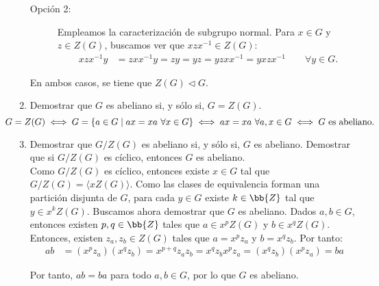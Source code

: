 \begin{ejercicio}
\begin{enumerate}
\begin{description}
            \item[Opción 2:]
            Empleamos la caracterización de subgrupo normal. Para $x\in G$ y $z\in Z(G)$, buscamos ver que $xzx^{-1}\in Z(G)$:
            \begin{align*}
                xzx^{-1}y &= zxx^{-1}y = zy = yz = yzxx^{-1} = yxzx^{-1}\qquad \forall y\in G.
            \end{align*}
        \end{description}
        En ambos casos, se tiene que $Z(G)\lhd G$.
        \item Demostrar que $G$ es abeliano si, y sólo si, $G=Z(G)$.
        \begin{equation*}
            \hspace{-1cm}G=Z(G) \iff G=\{a\in G\mid ax=xa\ \forall x\in G\} \iff ax=xa\ \forall a,x\in G \iff G\text{ es abeliano.}
        \end{equation*}
        \item\label{ej:4.4.4} Demostrar que $G/Z(G)$ es abeliano si, y sólo si, $G$ es abeliano.
        Demostrar que si $G/Z(G)$ es cíclico, entonces $G$ es abeliano.\\
        
        Como $G/Z(G)$ es cíclico, entonces existe $x\in G$ tal que $G/Z(G)=\langle xZ(G)\rangle$. 
        Como las clases de equivalencia forman una partición disjunta de $G$, para cada $y\in G$ existe $k\in \bb{Z}$ tal que $y\in x^kZ(G)$. Buscamos ahora demostrar que $G$ es abeliano. Dados $a,b\in G$, entonces existen $p,q\in \bb{Z}$ tales que $a\in x^pZ(G)$ y $b\in x^qZ(G)$. Entonces, existen $z_a,z_b\in Z(G)$ tales que $a=x^pz_a$ y $b=x^qz_b$. Por tanto:
        \begin{align*}
            ab &= (x^pz_a)(x^qz_b) = x^{p+q}z_az_b = x^qz_b x^pz_a = (x^qz_b)(x^pz_a) = ba
        \end{align*}

        Por tanto, $ab=ba$ para todo $a,b\in G$, por lo que $G$ es abeliano.        
    \end{enumerate}
\end{ejercicio}

